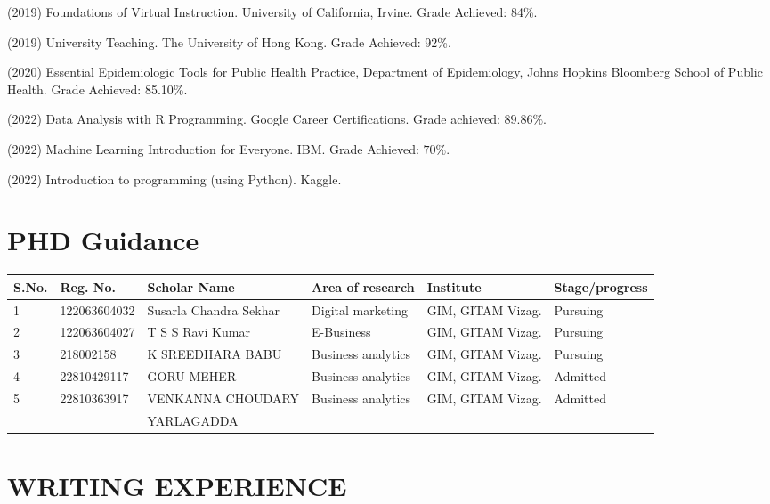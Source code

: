 \documentclass[10pt]{article}
\begin{document}
\begin{description}
\item (2019) Foundations of Virtual Instruction. University of California, Irvine. Grade Achieved: 84\%.
\item (2019) University Teaching. The University of Hong Kong. Grade Achieved: 92\%.
\item (2020) Essential Epidemiologic Tools for Public Health Practice, Department of Epidemiology, Johns Hopkins Bloomberg School of Public Health. Grade Achieved: 85.10\%.
\item (2022) Data Analysis with R Programming. Google Career Certifications. Grade achieved: $89.86\%$. 
\item (2022) Machine Learning Introduction for Everyone. IBM. Grade Achieved: $70\%$.
\item (2022) Introduction to programming (using Python). Kaggle.
\end{description}	
	


\section{PHD Guidance}

\begin{table}[ht]
\small
\centering 
\begin{tabular}{llllll} \hline 
S.No. & Reg. No. & Scholar Name & Area of research & Institute & Stage/progress \\ \hline 
1 & 122063604032 & Susarla Chandra Sekhar & Digital marketing & GIM, GITAM Vizag. & Pursuing \\ 
2 & 122063604027 & T S S Ravi Kumar & E-Business & GIM, GITAM Vizag. & Pursuing \\
3 & 218002158 & K SREEDHARA BABU & Business analytics & GIM, GITAM Vizag. & Pursuing \\ 
4 & 22810429117 & GORU MEHER & Business analytics & GIM, GITAM Vizag. & Admitted \\
5 & 22810363917 & VENKANNA CHOUDARY  & Business analytics & GIM, GITAM Vizag. & Admitted \\ 
 &  & YARLAGADDA & & & \\ \hline 
\end{tabular}
\end{table}

\section{WRITING EXPERIENCE} \hline \vspace{0.5cm}
\end{document}
